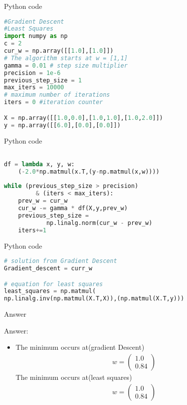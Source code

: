 \documentclass{beamer}
\begin{document}
\begin{frame}[fragile]{Python code}

\begin{lstlisting}[language=Python]
#Gradient Descent
#Least Squares
import numpy as np 
c = 2
cur_w = np.array([[1.0],[1.0]]) 
# The algorithm starts at w = [1,1]
gamma = 0.01 # step size multiplier
precision = 1e-6
previous_step_size = 1 
max_iters = 10000 
# maximum number of iterations
iters = 0 #iteration counter

X = np.array([[1.0,0.0],[1.0,1.0],[1.0,2.0]])
y = np.array([[6.0],[0.0],[0.0]])

\end{lstlisting}

\end{frame}

\begin{frame}[fragile]{Python code}

\begin{lstlisting}[language=Python]

df = lambda x, y, w:
	(-2.0*np.matmul(x.T,(y-np.matmul(x,w))))
		 
while (previous_step_size > precision)
		 & (iters < max_iters):
    prev_w = cur_w
    cur_w -= gamma * df(X,y,prev_w)
    previous_step_size = 
    		np.linalg.norm(cur_w - prev_w)
    iters+=1

\end{lstlisting}

\end{frame}


\begin{frame}[fragile]{Python code}

\begin{lstlisting}[language=Python]
# solution from Gradient Descent
Gradient_descent = curr_w

# equation for least squares
least_squares = np.matmul(
np.linalg.inv(np.matmul(X.T,X)),(np.matmul(X.T,y)))


\end{lstlisting}

\end{frame}

\begin{frame}[fragile]{Answer}

Answer:

\begin{itemize}
  \item {
  The minimum occurs at(gradient Descent)
\begin{align}
  w = \begin{pmatrix}
		1.0 \\ 0.84
		\end{pmatrix}
 \end{align}
The minimum occurs at(least squares)
 \begin{align}
  w = \begin{pmatrix}
		1.0 \\ 0.84
		\end{pmatrix}
 \end{align}

  }
 \end{itemize}

\end{frame}
\end{document}
